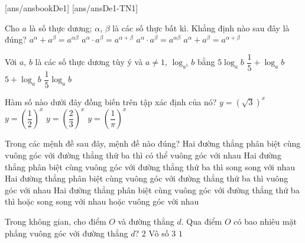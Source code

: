 ﻿\begin{name}
	{\tenchude}
	{\tendethi}
	{\tentruong}
	{\thoigian}
\end{name}
[ans/ansbookDe1]
\TN
{}[ans/ansDe1-TN1]
\begin{ex}%
	Cho $a$ là số thực dương; $\alpha$, $\beta$ là các số thực bất kì. Khẳng định nào sau đây là đúng?
	\choice
	{$a^\alpha + a^\beta = a^{\alpha\beta}$}
	{\True $a^\alpha\cdot a^\beta = a^{\alpha + \beta}$}
	{$a^\alpha\cdot a^\beta = a^{\alpha\beta}$}
	{$a^\alpha + a^\beta = a^{\alpha + \beta}$}
	\end{ex}

\begin{ex}%
Với $a$, $b$ là các số thực dương tùy ý và $a\ne 1$, $\log_{a^5}b$ bằng
\choice
{$5\log_ab$}
{$\dfrac{1}{5}+\log_ab$}
{$5+\log_ab$}
{\True $\dfrac{1}{5}\log_ab$}
\end{ex}

\begin{ex}%
Hàm số nào dưới đây đồng biến trên tập xác định của nó?
\choice
{\True $y=\left(\sqrt{3}\right)^x$}
{$y=\left(\dfrac{1}{2}\right)^x$}
{$y=\left(\dfrac{2}{3}\right)^x$}
{$y=\left(\dfrac{1}{\pi}\right)^x$}
\end{ex}

\begin{ex}%
Trong các mệnh đề sau đây, mệnh đề nào đúng?
\choice
{\True Hai đường thẳng phân biệt cùng vuông góc với đường thẳng thứ ba thì có thể vuông góc với nhau}
{Hai đường thẳng phân biệt cùng vuông góc với đường thẳng thứ ba thì song song với nhau}
{Hai đường thẳng phân biệt cùng vuông góc với đường thẳng thứ ba thì vuông góc với nhau}
{Hai đường thẳng phân biệt cùng vuông góc với đường thẳng thứ ba thì hoặc song song với nhau hoặc vuông góc với nhau}
\end{ex}

\begin{ex}%
Trong không gian, cho điểm $O$ và đường thẳng $d$. Qua điểm $O$ có bao nhiêu mặt phẳng vuông góc với đường thẳng $d$?
\choice
{$2$}
{Vô số}
{$3$}
{\True $1$}
\end{ex}

